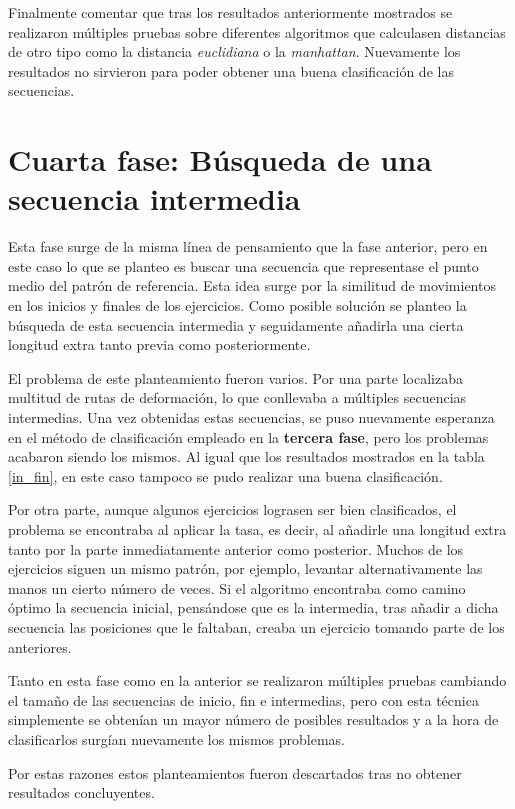 Finalmente comentar que tras los resultados anteriormente mostrados se realizaron múltiples pruebas sobre diferentes algoritmos que calculasen distancias de otro tipo como la distancia \textit{euclidiana} o la \textit{manhattan}. Nuevamente los resultados no sirvieron para poder obtener una buena clasificación de las secuencias. 


\section{Cuarta fase: Búsqueda de una secuencia intermedia}

Esta fase surge de la misma línea de pensamiento que la fase anterior, pero en este caso lo que se planteo es buscar una secuencia que representase el punto medio del patrón de referencia. Esta idea surge por la similitud de movimientos en los inicios y finales de los ejercicios. Como posible solución se planteo la búsqueda de esta secuencia intermedia y seguidamente añadirla una cierta longitud extra tanto previa como posteriormente. 


El problema de este planteamiento fueron varios. Por una parte localizaba multitud de rutas de deformación, lo que conllevaba a múltiples secuencias intermedias. Una vez obtenidas estas secuencias, se puso nuevamente esperanza en el método de clasificación empleado en la \textbf{tercera fase}, pero los problemas acabaron siendo los mismos. Al igual que los resultados mostrados en la tabla \ref{in_fin}, en este caso tampoco se pudo realizar una buena clasificación. 


Por otra parte, aunque algunos ejercicios lograsen ser bien clasificados, el problema se encontraba al aplicar la tasa, es decir, al añadirle una longitud extra tanto por la parte inmediatamente anterior como posterior. Muchos de los ejercicios siguen un mismo patrón, por ejemplo, levantar alternativamente las manos un cierto número de veces. Si el algoritmo encontraba como camino óptimo la secuencia inicial, pensándose que es la intermedia, tras añadir a dicha secuencia las posiciones que le faltaban, creaba un ejercicio tomando parte de los anteriores. 

Tanto en esta fase como en la anterior se realizaron múltiples pruebas cambiando el tamaño de las secuencias de inicio, fin e intermedias, pero con esta técnica simplemente se obtenían un mayor número de posibles resultados y a la hora de clasificarlos surgían nuevamente los mismos problemas. 

Por estas razones estos planteamientos fueron descartados tras no obtener resultados concluyentes.

